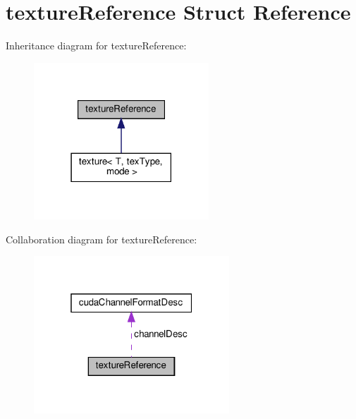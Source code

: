 \hypertarget{structtextureReference}{}\section{texture\+Reference Struct Reference}
\label{structtextureReference}


Inheritance diagram for texture\+Reference\+:\nopagebreak
\begin{figure}[H]
\begin{center}
\leavevmode
\includegraphics[width=186pt]{structtextureReference__inherit__graph}
\end{center}
\end{figure}


Collaboration diagram for texture\+Reference\+:\nopagebreak
\begin{figure}[H]
\begin{center}
\leavevmode
\includegraphics[width=208pt]{structtextureReference__coll__graph}
\end{center}
\end{figure}
